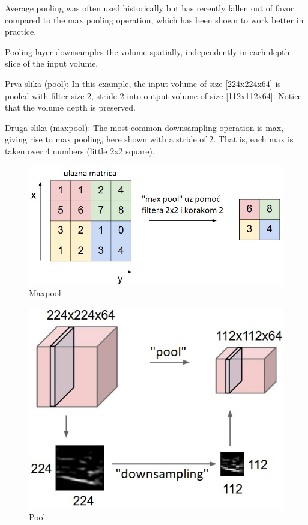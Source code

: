 \documentclass[a4paper]{article}
\begin{document}
 Average pooling was often used historically but has recently fallen out of favor compared to the max pooling operation, which has been shown to work better in practice.
 
 Pooling layer downsamples the volume spatially, independently in each depth slice of the input volume.
 
Prva slika (pool): In this example, the input volume of size [224x224x64] is pooled with filter size 2, stride 2 into output volume of size [112x112x64]. Notice that the volume depth is preserved.
 
Druga slika (maxpool): The most common downsampling operation is max, giving rise to max pooling, here shown with a stride of 2. That is, each max is taken over 4 numbers (little 2x2 square).

 
\begin{figure}[h!]
\begin{center}
\includegraphics[scale=0.4]{maxpool.jpeg}
\end{center}
\caption{Maxpool}
\label{fig:maxpool}
\end{figure}


\begin{figure}[h!]
\begin{center}
\includegraphics[scale=0.4]{pool.jpeg}
\end{center}
\caption{Pool}
\label{fig:pool}
\end{figure}
\end{document}
